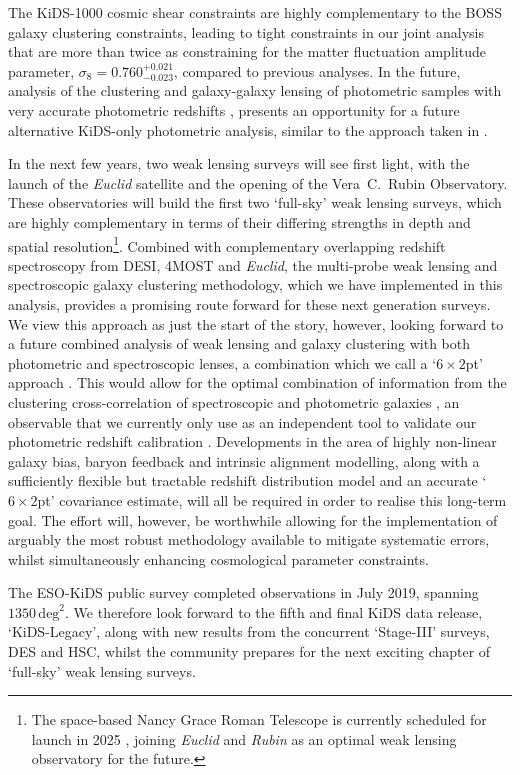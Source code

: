 The KiDS-1000 cosmic shear constraints are highly complementary to the BOSS galaxy clustering constraints, leading to tight constraints in our joint \tttp analysis that are more than twice as constraining for the matter fluctuation amplitude parameter, $\sigma_8 = 0.760^{+0.021}_{-0.023}$, compared to previous \tttp analyses.    In the future, analysis of the clustering and galaxy-galaxy lensing of photometric samples with very accurate photometric redshifts \citep[see for example][]{vakili/etal:2019}, presents an opportunity for a future alternative KiDS-only \tttp photometric analysis, similar to the approach taken in \citet{abbott/etal:2018}.

In the next few years, two weak lensing surveys will see first light, with the launch of the {\it Euclid} satellite and the opening of the Vera~C.~Rubin Observatory.   These observatories will build the first two `full-sky' weak lensing surveys, which are highly complementary in terms of their differing strengths in depth and spatial resolution\footnote{The space-based Nancy Grace Roman Telescope is currently scheduled for launch in 2025 \citep{akeson/etal:2019}, joining {\it Euclid} and {\it Rubin} as an optimal weak lensing observatory for the future.}.  Combined with complementary overlapping redshift spectroscopy from DESI, 4MOST and {\it Euclid}, the multi-probe weak lensing and spectroscopic galaxy clustering methodology, which we have implemented in this analysis, provides a promising route forward for these next generation surveys.   We view this \tttp approach as just the start of the story, however, looking forward to a future combined analysis of weak lensing and galaxy clustering with both photometric and spectroscopic lenses, a combination which we call a `$6\times2$pt' approach \citep{bernstein:2009}.    This would allow for the optimal combination of information from the clustering cross-correlation of spectroscopic and photometric galaxies \citep{newman:2008}, an observable that we currently only use as an independent tool to validate our photometric redshift calibration \citep{hildebrandt/etal:inprep}.      Developments in the area of highly non-linear galaxy bias, baryon feedback and intrinsic alignment modelling, along with a sufficiently flexible but tractable redshift distribution model and an accurate `$6\times2$pt' covariance estimate, will all be required in order to realise this long-term goal.   The effort will, however, be worthwhile allowing for the implementation of arguably the most robust methodology available to mitigate systematic errors, whilst simultaneously enhancing cosmological parameter constraints.

The ESO-KiDS public survey completed observations in July 2019, spanning $1350\,\mathrm{deg}^{2}$.   We therefore look forward to the fifth and final KiDS data release, `KiDS-Legacy', along with new results from the concurrent `Stage-III' surveys, DES and HSC, whilst the community prepares for the next exciting chapter of `full-sky' weak lensing surveys.  